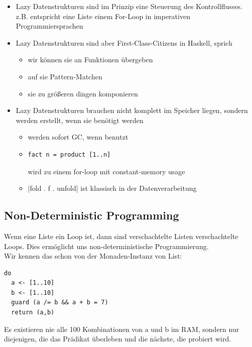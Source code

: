 \documentclass{beamer}
\begin{document}
\begin{frame}[fragile]
\begin{itemize}
 \item Lazy Datenstrukturen sind im Prinzip eine Steuerung des Kontrollflusses.\\\pause
       z.B. entspricht eine Liste einem For-Loop in imperativen Programmiersprachen
 \pause
 \item Lazy Datenstrukturen sind aber First-Class-Citizens in Haskell, sprich\\\pause
       \begin{itemize}
        \item wir können sie an Funktionen übergeben
        \pause
        \item auf sie Pattern-Matchen
        \pause
        \item sie zu größeren dingen komponieren
       \end{itemize}
 \pause
 \item Lazy Datenstrukturen brauchen nicht komplett im Speicher liegen, sondern werden erstellt, wenn sie benötigt werden\\\pause
       \begin{itemize}
        \item werden sofort GC, wenn benutzt
        \pause
        \item \begin{verbatim}
fact n = product [1..n]
              \end{verbatim}
              wird zu einem for-loop mit constant-memory usage
        \pause
        \item {}|fold . f . unfold|
              ist klassisch in der Datenverarbeitung

       \end{itemize}

\end{itemize}

\end{frame}

\subsection{Non-Deterministic Programming}

\begin{frame}[fragile]
Wenn eine Liste ein Loop ist, dann sind verschachtelte Listen verschachtelte Loops. Dies ermöglicht uns non-deterministische Programmierung.\\\pause
Wir kennen das schon von der Monaden-Instanz von List:
\begin{verbatim}
do
  a <- [1..10]
  b <- [1..10]
  guard (a /= b && a + b = 7)
  return (a,b)
\end{verbatim}
Es existieren nie alle 100 Kombinationen von a und b im RAM, sondern nur diejenigen, die das Prädikat überleben und die nächste, die probiert wird.
\end{frame}
\end{document}
